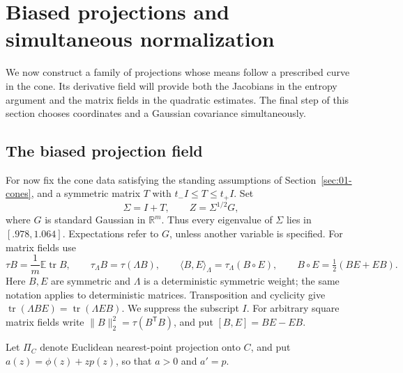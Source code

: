 \section{Biased projections and simultaneous normalization}\label{sec:02-projections}

We now construct a family of projections whose means follow a prescribed curve in the cone. Its derivative field will provide both the Jacobians in the entropy argument and the matrix fields in the quadratic estimates. The final step of this section chooses coordinates and a Gaussian covariance simultaneously.

\subsection{The biased projection field}
For now fix the cone data satisfying the standing assumptions of Section~\ref{sec:01-cones}, and a symmetric matrix \(T\) with \(t_-I\le T\le t_+I\). Set
\[
\Sigma=I+T,\qquad Z=\Sigma^{1/2}G,
\]
where \(G\) is standard Gaussian in \(\mathbb R^m\). Thus every eigenvalue of \(\Sigma\) lies in \([.978,1.064]\). Expectations refer to \(G\), unless another variable is specified. For matrix fields use
\[
\tau B=\frac1m\mathbb E\operatorname{tr}B,\qquad
\tau_\Lambda B=\tau(\Lambda B),\qquad
\langle B,E\rangle_\Lambda=\tau_\Lambda(B\circ E),\qquad
B\circ E=\tfrac12(BE+EB).
\]
Here \(B,E\) are symmetric and \(\Lambda\) is a deterministic symmetric weight; the same notation applies to deterministic matrices. Transposition and cyclicity give \(\operatorname{tr}(\Lambda BE)=\operatorname{tr}(\Lambda EB)\). We suppress the subscript \(I\). For arbitrary square matrix fields write \(\|B\|_2^2=\tau(B^{\mathsf T}B)\), and put \([B,E]=BE-EB\).

Let \(\Pi_C\) denote Euclidean nearest-point projection onto \(C\), and put \(a(z)=\phi(z)+zp(z)\), so that \(a>0\) and \(a'=p\).

